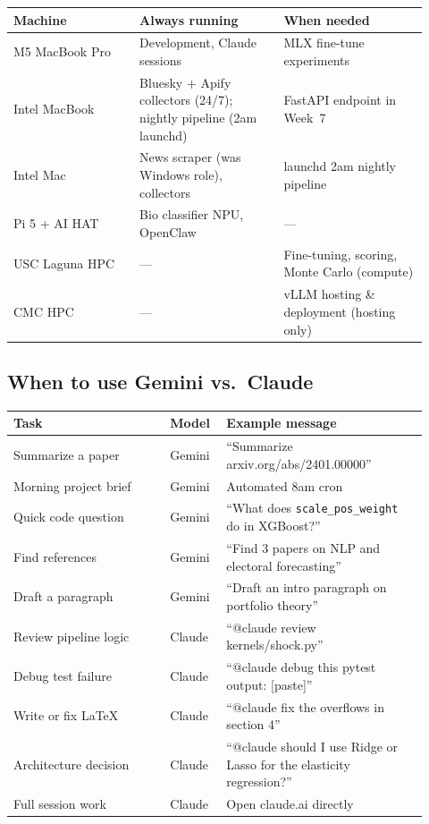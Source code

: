 \documentclass[11pt]{article}
\begin{document}
\begin{center}
\begin{tabular}{p{0.28\linewidth}p{0.32\linewidth}p{0.32\linewidth}}
\toprule
\textbf{Machine} & \textbf{Always running} & \textbf{When needed} \\
\midrule
M5 MacBook Pro & Development, Claude sessions & MLX fine-tune experiments \\
Intel MacBook & Bluesky + Apify collectors (24/7); nightly pipeline (2am launchd) & FastAPI endpoint in Week~7 \\
Intel Mac & News scraper (was Windows role), collectors & launchd 2am nightly pipeline \\
Pi 5 + AI HAT & Bio classifier NPU, OpenClaw & --- \\
USC Laguna HPC & --- & Fine-tuning, scoring, Monte Carlo (compute) \\
CMC HPC & --- & vLLM hosting \& deployment (hosting only) \\
\bottomrule
\end{tabular}
\end{center}

\subsection*{When to use Gemini vs.\ Claude}

\begin{center}
\begin{tabular}{p{0.35\linewidth}p{0.12\linewidth}p{0.45\linewidth}}
\toprule
\textbf{Task} & \textbf{Model} & \textbf{Example message} \\
\midrule
Summarize a paper & Gemini & ``Summarize arxiv.org/abs/2401.00000'' \\
Morning project brief & Gemini & Automated 8am cron \\
Quick code question & Gemini & ``What does \texttt{scale\_pos\_weight} do in XGBoost?'' \\
Find references & Gemini & ``Find 3 papers on NLP and electoral forecasting'' \\
Draft a paragraph & Gemini & ``Draft an intro paragraph on portfolio theory'' \\
\midrule
Review pipeline logic & Claude & ``@claude review kernels/shock.py'' \\
Debug test failure & Claude & ``@claude debug this pytest output: [paste]'' \\
Write or fix LaTeX & Claude & ``@claude fix the overflows in section 4'' \\
Architecture decision & Claude & ``@claude should I use Ridge or Lasso for the elasticity regression?'' \\
Full session work & Claude & Open claude.ai directly \\
\bottomrule
\end{tabular}
\end{center}
\end{document}
